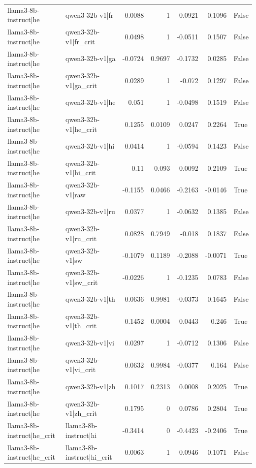 \begin{table}
\begin{tabular}{l l r r r r l}
llama3-8b-instruct|he & qwen3-32b-v1|fr & 0.0088 & 1 & -0.0921 & 0.1096 & False \\
llama3-8b-instruct|he & qwen3-32b-v1|fr_crit & 0.0498 & 1 & -0.0511 & 0.1507 & False \\
llama3-8b-instruct|he & qwen3-32b-v1|ga & -0.0724 & 0.9697 & -0.1732 & 0.0285 & False \\
llama3-8b-instruct|he & qwen3-32b-v1|ga_crit & 0.0289 & 1 & -0.072 & 0.1297 & False \\
llama3-8b-instruct|he & qwen3-32b-v1|he & 0.051 & 1 & -0.0498 & 0.1519 & False \\
llama3-8b-instruct|he & qwen3-32b-v1|he_crit & 0.1255 & 0.0109 & 0.0247 & 0.2264 & True \\
llama3-8b-instruct|he & qwen3-32b-v1|hi & 0.0414 & 1 & -0.0594 & 0.1423 & False \\
llama3-8b-instruct|he & qwen3-32b-v1|hi_crit & 0.11 & 0.093 & 0.0092 & 0.2109 & True \\
llama3-8b-instruct|he & qwen3-32b-v1|raw & -0.1155 & 0.0466 & -0.2163 & -0.0146 & True \\
llama3-8b-instruct|he & qwen3-32b-v1|ru & 0.0377 & 1 & -0.0632 & 0.1385 & False \\
llama3-8b-instruct|he & qwen3-32b-v1|ru_crit & 0.0828 & 0.7949 & -0.018 & 0.1837 & False \\
llama3-8b-instruct|he & qwen3-32b-v1|sw & -0.1079 & 0.1189 & -0.2088 & -0.0071 & True \\
llama3-8b-instruct|he & qwen3-32b-v1|sw_crit & -0.0226 & 1 & -0.1235 & 0.0783 & False \\
llama3-8b-instruct|he & qwen3-32b-v1|th & 0.0636 & 0.9981 & -0.0373 & 0.1645 & False \\
llama3-8b-instruct|he & qwen3-32b-v1|th_crit & 0.1452 & 0.0004 & 0.0443 & 0.246 & True \\
llama3-8b-instruct|he & qwen3-32b-v1|vi & 0.0297 & 1 & -0.0712 & 0.1306 & False \\
llama3-8b-instruct|he & qwen3-32b-v1|vi_crit & 0.0632 & 0.9984 & -0.0377 & 0.164 & False \\
llama3-8b-instruct|he & qwen3-32b-v1|zh & 0.1017 & 0.2313 & 0.0008 & 0.2025 & True \\
llama3-8b-instruct|he & qwen3-32b-v1|zh_crit & 0.1795 & 0 & 0.0786 & 0.2804 & True \\
llama3-8b-instruct|he_crit & llama3-8b-instruct|hi & -0.3414 & 0 & -0.4423 & -0.2406 & True \\
llama3-8b-instruct|he_crit & llama3-8b-instruct|hi_crit & 0.0063 & 1 & -0.0946 & 0.1071 & False \\

\end{tabular}
\end{table}
